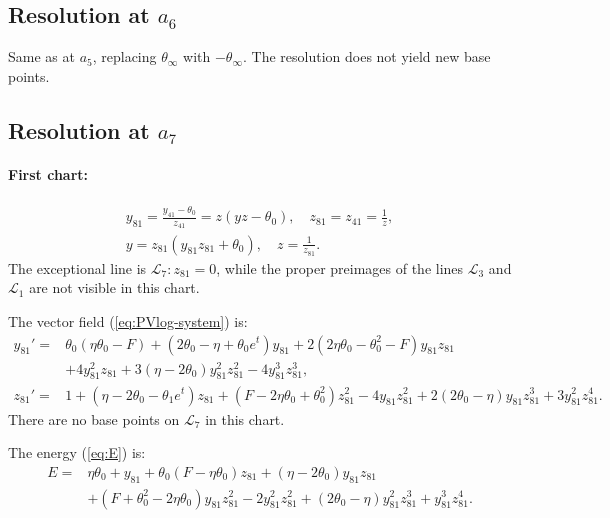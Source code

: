 \subsection{Resolution at $a_6$}\label{a6-blow}

Same as at $a_5$, replacing $\theta_{\infty}$ with $-\theta_{\infty}$.
The resolution does not yield new base points.

\subsection{Resolution at $a_7$}\label{a7-blow}
\paragraph{First chart:}
\begin{gather*}
y_{81}=\frac{y_{41}-\theta_0}{z_{41}}=z(yz-\theta_0),
\quad
z_{81}=z_{41}=\frac1z,
\\
y=z_{81}(y_{81}z_{81}+\theta_0),
\quad
z=\frac1{z_{81}}.
\end{gather*}
The exceptional line is $\mathcal{L}_7 : z_{81}=0$, while the proper preimages of the lines $\mathcal{L}_{3}$ and $\mathcal{L}_1$ are not visible in this chart. 

The vector field  (\ref{eq:PVlog-system}) is:
$$
\begin{aligned}
y_{81}'=&
 \theta_0(\eta \theta_0-F) + (2 \theta_0-\eta+\theta_0 e^t) y_{81}
+2( 2 \eta \theta_0  -  \theta_0^2-F) y_{81} z_{81} 
\\&
+ 4 y_{81}^2 z_{81} + 
 3( \eta - 2 \theta_0 )y_{81}^2 z_{81}^2 - 4 y_{81}^3 z_{81}^3
,
\\
z_{81}'=&
1 + (\eta - 2 \theta_0-\theta_1 e^t) z_{81} + (F  - 2 \eta \theta_0  +  \theta_0^2) z_{81}^2 - 4 y_{81} z_{81}^2
+2(2\theta_0-  \eta) y_{81} z_{81}^3  + 
 3 y_{81}^2 z_{81}^4
.
\end{aligned}
$$
There are no base points on $\mathcal{L}_7$ in this chart.

The energy (\ref{eq:E}) is:
$$
\begin{aligned}
E=&
\eta \theta_0
+y_{81}
+ \theta_0(F-\eta \theta_0) z_{81}
+(\eta-2 \theta_0) y_{81} z_{81}
\\&
+(F +\theta_0^2 -2 \eta \theta_0) y_{81} z_{81}^2
-2 y_{81}^2 z_{81}^2
+(2 \theta_0 -\eta) y_{81}^2 z_{81}^3
+y_{81}^3 z_{81}^4
.
\end{aligned}
$$


